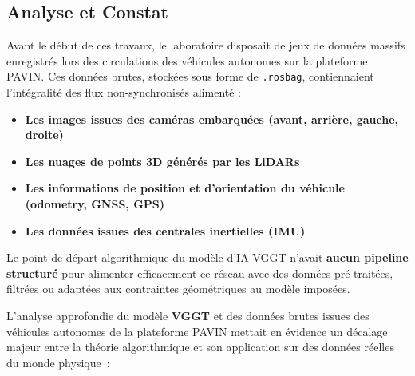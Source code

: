 \documentclass[12pt,a4paper,oneside]{report}
\begin{document}
\subsection{Analyse et Constat}
\vspace{0.5cm}
\hspace*{1em}Avant le début de ces travaux, le laboratoire disposait de jeux de données massifs enregistrés lors des circulations des véhicules autonomes sur la plateforme PAVIN. Ces données brutes, stockées sous forme de \texttt{.rosbag}, contiennaient l'intégralité des flux non-synchronisés alimenté : 
\vspace{.5cm}
\begin{itemize}
    \setlength{\itemsep}{1em}
    \renewcommand{\labelitemi}{{\large\bfseries\textbullet}}
    \item {\bfseries Les images issues des caméras embarquées (avant, arrière, gauche, droite)}
    \item {\bfseries Les nuages de points 3D générés par les LiDARs}
    \item {\bfseries Les informations de position et d'orientation du véhicule (odometry, GNSS, GPS)}
    \item {\bfseries Les données issues des centrales inertielles (IMU)}
\end{itemize}
\bigskip
\hspace*{.5cm}Le point de départ algorithmique du modèle d'IA VGGT n'avait \textbf{aucun pipeline structuré} pour alimenter efficacement ce réseau avec des données pré-traitées, filtrées ou adaptées aux contraintes géométriques au modèle imposées.

\bigskip

L'analyse approfondie du modèle \textbf{VGGT} et des données brutes issues des véhicules autonomes de la plateforme PAVIN mettait en évidence un décalage majeur entre la théorie algorithmique et son application sur des données réelles du monde physique~:\par\bigskip

\newpage
\end{document}

